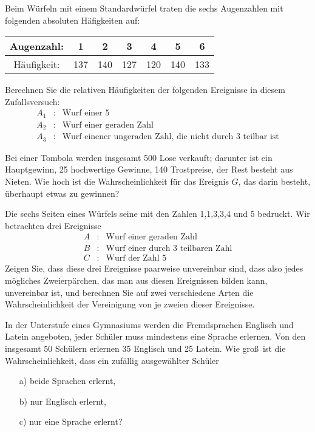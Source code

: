 \documentclass[11pt]{article}
\begin{document}
\begin{task}
	Beim W\" urfeln mit einem Standardw\" urfel traten die sechs Augenzahlen mit folgenden absoluten H\" afigkeiten auf:
	
	\begin{tabular}{|c|c|c|c|c|c|c|}
		\hline 
		Augenzahl: & 1 & 2 & 3 & 4 & 5 & 6 \\ 
		\hline 
		H\" aufigkeit: & 137 & 140 & 127 & 120 & 140 & 133 \\ 
		\hline 
	\end{tabular}
	
	Berechnen Sie die relativen H\" aufigkeiten der folgenden Ereignisse in diesem Zufallsversuch:
	\begin{eqnarray*}
		A_1 &:& \text{Wurf einer 5}\\
		A_2 &:& \text{Wurf einer geraden Zahl}\\
		A_3 &:& \text{Wurf einener ungeraden Zahl, die nicht durch 3 teilbar ist}
	\end{eqnarray*}
\end{task}

\begin{task}
	Bei einer Tombola werden insgesamt 500 Lose verkauft; darunter ist ein Hauptgewinn, 25 hochwertige Gewinne, 140 Trostpreise, der Rest besteht aus Nieten. Wie hoch ist die Wahrscheinlichkeit f\" ur das Ereignis $G$, das darin besteht, \" uberhaupt etwas zu gewinnen?
\end{task}

\begin{task}
	Die sechs Seiten eines W\" urfels seine mit den Zahlen
	1,1,3,3,4 und 5 bedruckt. Wir betrachten drei Ereignisse
	\begin{eqnarray*}
		A &:& \text{Wurf einer geraden Zahl}\\
		B &:& \text{Wurf einer durch 3 teilbaren Zahl}\\
		C&:& \text{Wurf der Zahl 5}
	\end{eqnarray*}
	Zeigen Sie, dass diese drei Ereignisse paarweise unvereinbar sind, dass also jedes m\" ogliches Zweierp\" archen, das man aus diesen Ereignissen bilden kann, unvereinbar ist, und berechnen Sie auf zwei verschiedene Arten die Wahrscheinlichkeit der Vereinigung von je zweien dieser Ereignisse.
	\item In der Unterstufe eines Gymnasiums werden die Fremdsprachen Englisch und Latein angeboten, jeder Sch\" uler muss mindestens eine Sprache erlernen. Von den insgesamt 50 Sch\" ulern erlernen 35 Englisch und 25 Latein. Wie gro\ss\ ist die Wahrscheinlichkeit, dass ein zuf\" allig ausgew\" ahlter Sch\" uler
	\begin{itemize}
		\item[a)] beide Sprachen erlernt,
		\item[b)] nur Englisch erlernt,
		\item[c)] nur eine Sprache erlernt?
	\end{itemize}
\end{task}

\end{document}
